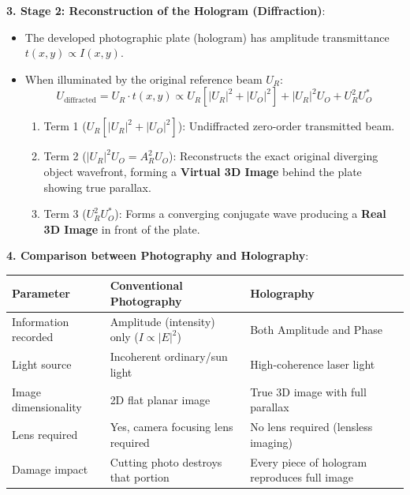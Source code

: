 \begin{theorysol}
\textbf{3. Stage 2: Reconstruction of the Hologram (Diffraction)}:
\begin{itemize}
    \item The developed photographic plate (hologram) has amplitude transmittance $t(x,y) \propto I(x,y)$.
    \item When illuminated by the original reference beam $U_R$:
    \begin{equation}
    U_{\text{diffracted}} = U_R \cdot t(x,y) \propto U_R \left[ |U_R|^2 + |U_O|^2 \right] + |U_R|^2 U_O + U_R^2 U_O^*
    \end{equation}
    \begin{enumerate}
        \item Term 1 ($U_R [|U_R|^2 + |U_O|^2]$): Undiffracted zero-order transmitted beam.
        \item Term 2 ($|U_R|^2 U_O = A_R^2 U_O$): Reconstructs the exact original diverging object wavefront, forming a \textbf{Virtual 3D Image} behind the plate showing true parallax.
        \item Term 3 ($U_R^2 U_O^*$): Forms a converging conjugate wave producing a \textbf{Real 3D Image} in front of the plate.
    \end{enumerate}
\end{itemize}

\textbf{4. Comparison between Photography and Holography}:
\begin{center}
\begin{tabularx}{\linewidth}{|l|X|X|}
\hline

\textbf{Parameter} & \textbf{Conventional Photography} & \textbf{Holography} \\
\hline
Information recorded & Amplitude (intensity) only ($I \propto |E|^2$) & Both Amplitude and Phase \\
Light source & Incoherent ordinary/sun light & High-coherence laser light \\
Image dimensionality & 2D flat planar image & True 3D image with full parallax \\
Lens required & Yes, camera focusing lens required & No lens required (lensless imaging) \\
Damage impact & Cutting photo destroys that portion & Every piece of hologram reproduces full image \\
\hline
\end{tabularx}
\end{center}
\end{theorysol}
\vspace{4mm}

